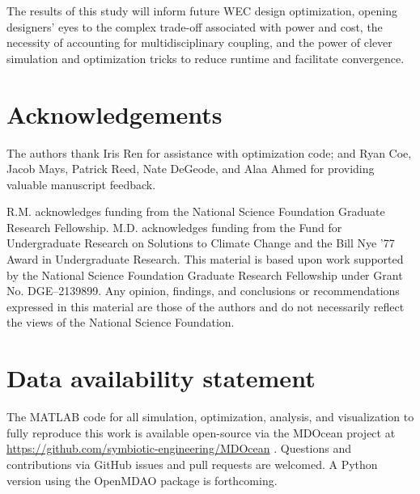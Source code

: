 \documentclass[preprint,12pt]{elsarticle}
\begin{document}
The results of this study will inform future WEC design optimization, opening designers' eyes to the complex trade-off associated with power and cost, the necessity of accounting for multidisciplinary coupling, and the power of clever simulation and optimization tricks to reduce runtime and facilitate convergence.

\section{Acknowledgements}
The authors thank Iris Ren for assistance with optimization code; and Ryan Coe, Jacob Mays, Patrick Reed, Nate DeGeode, and Alaa Ahmed for providing valuable manuscript feedback.

R.M. acknowledges funding from the National Science Foundation Graduate Research Fellowship.
M.D. acknowledges funding from the Fund for Undergraduate Research on Solutions to Climate Change and the Bill Nye ’77 Award in Undergraduate Research.
This material is based upon work supported by the National Science Foundation Graduate Research Fellowship under Grant No.
DGE–2139899.
Any opinion, findings, and conclusions or recommendations expressed in this material are those of the authors and do not necessarily reflect the views of the National Science Foundation.

\section{Data availability statement}
The MATLAB code for all simulation, optimization, analysis, and visualization to fully reproduce this work is available open-source via the MDOcean project at \url{https://github.com/symbiotic-engineering/MDOcean} \cite{mccabe_mdocean_2024}.
Questions and contributions via GitHub issues and pull requests are welcomed.
A Python version using the OpenMDAO package is forthcoming. %





\end{document}
